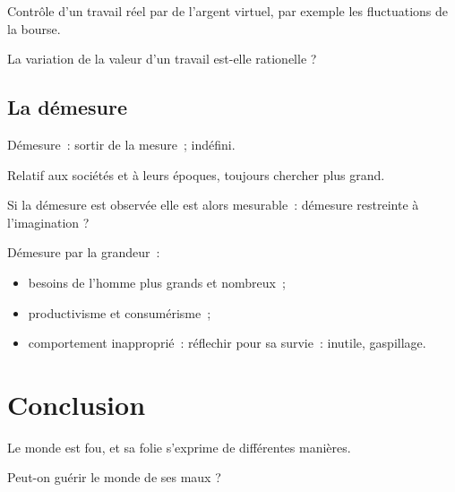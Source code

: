 \documentclass{beamer}
\begin{document}
\begin{frame}
	Contrôle d'un travail réel par de l'argent virtuel, par exemple les fluctuations de la bourse.

	La variation de la valeur d'un travail est-elle rationelle ?
\end{frame}

\subsection{La démesure}

\begin{frame}
  Démesure~: sortir de la mesure~; indéfini.

  Relatif aux sociétés et à leurs époques, toujours chercher plus grand.

	Si la démesure est observée elle est alors mesurable~: démesure restreinte à l'imagination ?
\end{frame}

\begin{frame}
	Démesure par la grandeur~:
	\begin{itemize}
	 \item besoins de l'homme plus grands et nombreux~;
	 \item productivisme et consumérisme~;
	 \item comportement inapproprié~: réflechir pour sa survie~: inutile, gaspillage.
	\end{itemize}
\end{frame}


\section{Conclusion}

\begin{frame}
	Le monde est fou, et sa folie s’exprime de différentes manières.

	Peut-on guérir le monde de ses maux ?
\end{frame}
\end{document}
